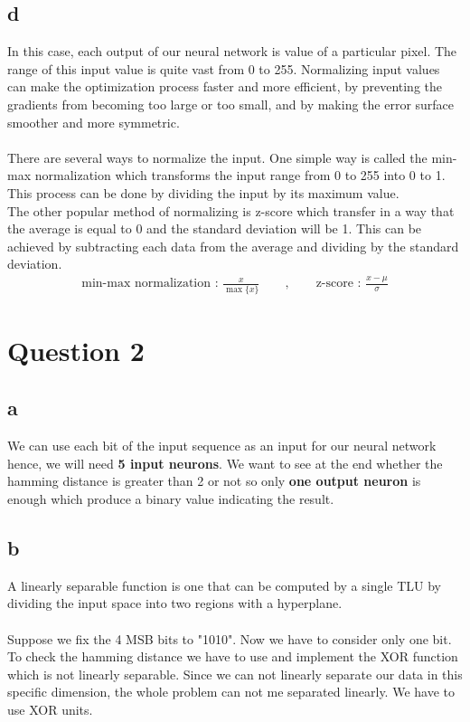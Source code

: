 \documentclass[]{article}
\begin{document}
	\subsection*{d}
	In this case, each output of our neural network is value of a particular pixel. The range of this input value is quite vast from 0 to 255. Normalizing input values can make the optimization process faster and more efficient, by preventing the gradients from becoming too large or too small, and by making the error surface smoother and more symmetric.\\\\
	There are several ways to normalize the input. One simple way is called the min-max normalization which transforms the input range from 0 to 255 into 0 to 1. This process can be done by dividing the input by its maximum value. \\
	The other popular method of normalizing is z-score which transfer in a way that the average is equal to 0 and the standard deviation will be 1. This can be achieved by subtracting each data from the average and dividing by the standard deviation.
	\begin{align*}
		\text{min-max normalization : } \frac{x}{\max\{x\}} \qquad , \qquad \text{z-score : } \frac{x - \mu}{\sigma}
	\end{align*}
	
	\section{Question 2}
	\subsection*{a}
	We can use each bit of the input sequence as an input for our neural network hence, we will need \textbf{5 input neurons}. We want to see at the end whether the hamming distance is greater than 2 or not so only \textbf{one output neuron} is enough which produce a binary value indicating the result.
	
	\subsection*{b}
	A linearly separable function is one that can be computed by a single TLU by dividing the input space into two regions with a hyperplane.\\\\
	Suppose we fix the 4 MSB bits to "1010". Now we have to consider only one bit. To check the hamming distance we have to use and implement the XOR function which is not linearly separable. Since we can not linearly separate our data in this specific dimension, the whole problem can not me separated linearly. We have to use XOR units.
	
\end{document}
